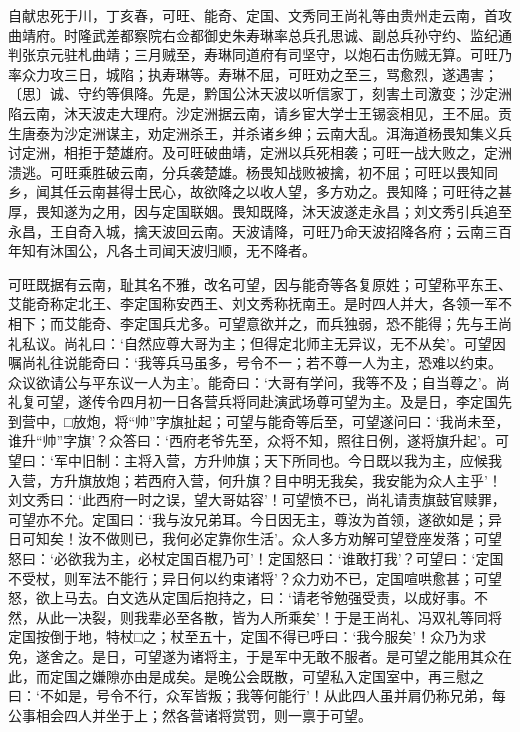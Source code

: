 \documentclass[]{article}
\begin{document}
自献忠死于川，丁亥春，可旺、能奇、定国、文秀同王尚礼等由贵州走云南，首攻曲靖府。时隆武差都察院右佥都御史朱寿琳率总兵孔思诚、副总兵孙守约、监纪通判张京元驻札曲靖；三月贼至，寿琳同道府有司坚守，以炮石击伤贼无算。可旺乃率众力攻三日，城陷；执寿琳等。寿琳不屈，可旺劝之至三，骂愈烈，遂遇害；〔思〕诚、守约等俱降。先是，黔国公沐天波以听信家丁，刻害土司激变；沙定洲陷云南，沐天波走大理府。沙定洲据云南，请乡宦大学士王锡衮相见，王不屈。贡生唐泰为沙定洲谋主，劝定洲杀王，并杀诸乡绅；云南大乱。洱海道杨畏知集义兵讨定洲，相拒于楚雄府。及可旺破曲靖，定洲以兵死相袭；可旺一战大败之，定洲溃逃。可旺乘胜破云南，分兵袭楚雄。杨畏知战败被擒，初不屈；可旺以畏知同乡，闻其任云南甚得士民心，故欲降之以收人望，多方劝之。畏知降；可旺待之甚厚，畏知遂为之用，因与定国联姻。畏知既降，沐天波遂走永昌；刘文秀引兵追至永昌，王自奇入城，擒天波回云南。天波请降，可旺乃命天波招降各府；云南三百年知有沐国公，凡各土司闻天波归顺，无不降者。

可旺既据有云南，耻其名不雅，改名可望，因与能奇等各复原姓；可望称平东王、艾能奇称定北王、李定国称安西王、刘文秀称抚南王。是时四人并大，各领一军不相下；而艾能奇、李定国兵尤多。可望意欲并之，而兵独弱，恐不能得；先与王尚礼私议。尚礼曰：`自然应尊大哥为主；但得定北师主无异议，无不从矣'。可望因嘱尚礼往说能奇曰：`我等兵马虽多，号令不一；若不尊一人为主，恐难以约束。众议欲请公与平东议一人为主'。能奇曰：`大哥有学问，我等不及；自当尊之'。尚礼复可望，遂传令四月初一日各营兵将同赴演武场尊可望为主。及是日，李定国先到营中，□放炮，将``帅''字旗扯起；可望与能奇等后至，可望遂问曰：`我尚未至，谁升``帅''字旗'？众答曰：`西府老爷先至，众将不知，照往日例，遂将旗升起'。可望曰：`军中旧制：主将入营，方升帅旗；天下所同也。今日既以我为主，应候我入营，方升旗放炮；若西府入营，何升旗？目中明无我矣，我安能为众人主乎'！刘文秀曰：`此西府一时之误，望大哥姑容'！可望愤不已，尚礼请责旗鼓官赎罪，可望亦不允。定国曰：`我与汝兄弟耳。今日因无主，尊汝为首领，遂欲如是；异日可知矣！汝不做则已，我何必定靠你生活'。众人多方劝解可望登座发落；可望怒曰：`必欲我为主，必杖定国百棍乃可'！定国怒曰：`谁敢打我'？可望曰：`定国不受杖，则军法不能行；异日何以约束诸将'？众力劝不已，定国喧哄愈甚；可望怒，欲上马去。白文选从定国后抱持之，曰：`请老爷勉强受责，以成好事。不然，从此一决裂，则我辈必至各散，皆为人所乘矣'！于是王尚礼、冯双礼等同将定国按倒于地，特杖□之；杖至五十，定国不得已呼曰：`我今服矣'！众乃为求免，遂舍之。是日，可望遂为诸将主，于是军中无敢不服者。是可望之能用其众在此，而定国之嫌隙亦由是成矣。是晚公会既散，可望私入定国室中，再三慰之曰：`不如是，号令不行，众军皆叛；我等何能行'！从此四人虽并肩仍称兄弟，每公事相会四人并坐于上；然各营诸将赏罚，则一禀于可望。
\end{document}
